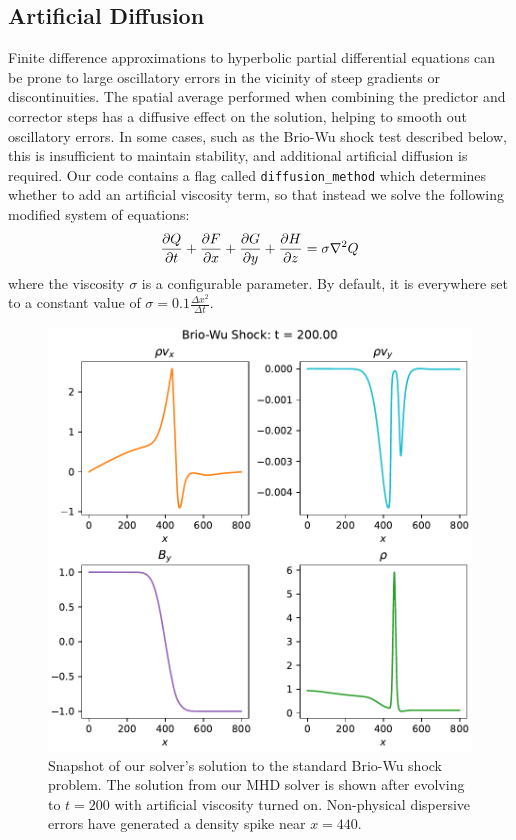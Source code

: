\documentclass[%
 reprint,
 amsmath,amssymb,
 aps,
]{revtex4-2}
\begin{document}
\subsection{Artificial Diffusion}

Finite difference approximations to hyperbolic partial differential equations can be prone to large oscillatory errors in the vicinity of steep gradients or discontinuities. The spatial average performed when combining the predictor and corrector steps has a diffusive effect on the solution, helping to smooth out oscillatory errors. In some cases, such as the Brio-Wu shock test described below, this is insufficient to maintain stability, and additional artificial diffusion is required. Our code contains a flag called \texttt{diffusion\_method} which determines whether to add an artificial viscosity term, so that instead we solve the following modified system of equations:
\begin{equation}
\pdv{Q}{t} + \pdv{F}{x} + \pdv{G}{y} + \pdv{H}{z} = \sigma \nabla ^2 Q
\end{equation}
where the viscosity $\sigma$ is a configurable parameter. By default, it is everywhere set to a constant value of $\sigma = 0.1 \frac{\Delta x ^2}{\Delta t}$.

\begin{figure}
\includegraphics[width=0.7\linewidth]{summary/shock_snapshots_n_20.pdf}
\caption{\label{fig:brio-wu-snapshot}Snapshot of our solver's solution to the standard Brio-Wu shock problem. The solution from our MHD solver is shown after evolving to $t=200$ with artificial viscosity turned on. Non-physical dispersive errors have generated a density spike near $x=440$.}
\end{figure}
\end{document}
